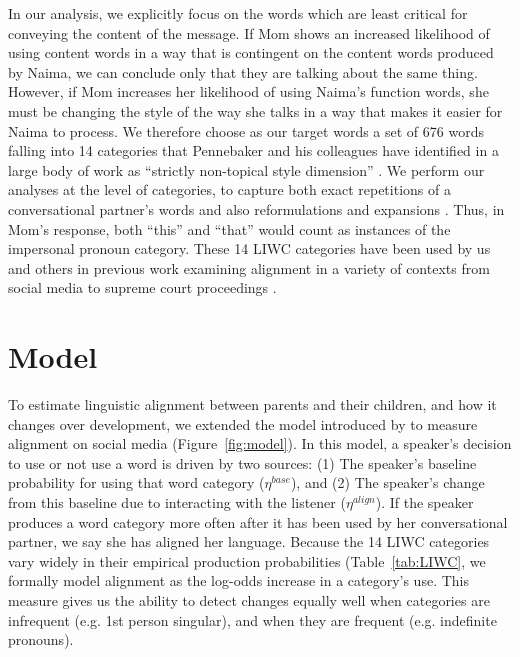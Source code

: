 \documentclass[10pt,letterpaper]{article}
\begin{document}
In our analysis, we explicitly focus on the words which are least critical for conveying the content of the message. If Mom shows an increased likelihood of using content words in a way that is contingent on the content words produced by Naima, we can conclude only that they are talking about the same thing. However, if Mom increases her likelihood of using Naima's function words, she must be changing the style of the way she talks in a way that makes it easier for Naima to process. We therefore choose as our target words a set of 676 words falling into 14 categories that Pennebaker and his colleagues have identified in a large body of work as ``strictly non-topical style dimension'' \cite<Linguistic Inquiry and Word Count>{pennebaker2007}. We perform our analyses at the level of categories, to capture both exact repetitions of a conversational partner's words and also reformulations and expansions \cite{chouinard2003}. Thus, in Mom's response, both ``this'' and ``that'' would count as instances of the impersonal pronoun category. These 14 LIWC categories have been used by us and others in previous work examining alignment in a variety of contexts from social media to supreme court proceedings \cite{danescu-niculescu-mizil2012, guo2015}.

\section{Model}
To estimate linguistic alignment between parents and their children, and how it changes over development, we extended the model introduced by  to measure alignment on social media (Figure~\ref{fig:model}). In this model, a speaker's decision to use or not use a word is driven by two sources: (1) The speaker's baseline probability for using that word category ($\eta^{base}$), and (2) The speaker's change from this baseline due to interacting with the listener ($\eta^{align}$). If the speaker produces a word category more often after it has been used by her conversational partner, we say she has aligned her language. Because the 14 LIWC categories vary widely in their empirical production probabilities (Table~\ref{tab:LIWC}, we formally model alignment as the log-odds increase in a category's use. This measure gives us the ability to detect changes equally well when categories are infrequent (e.g. 1st person singular), and when they are frequent (e.g. indefinite pronouns).
\end{document}
